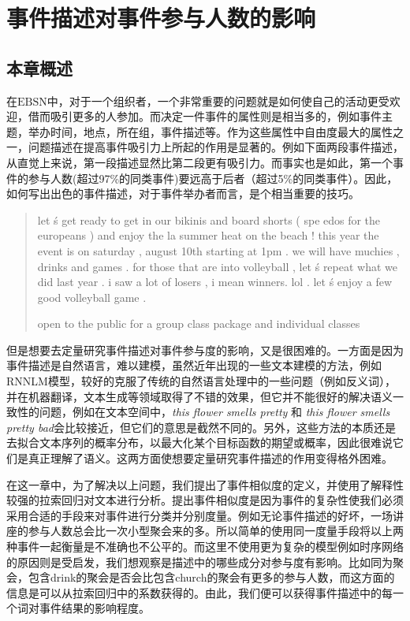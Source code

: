 \documentclass[12pt]{template}
\begin{document}
\section{事件描述对事件参与人数的影响} 
\subsection{本章概述} 
在$\mathrm{EBSN}$中，对于一个组织者，一个非常重要的问题就是如何使自己的活动更受欢迎，借而吸引更多的人参加。而决定一件事件的属性则是相当多的，例如事件主题，举办时间，地点，所在组，事件描述等。作为这些属性中自由度最大的属性之一，问题描述在提高事件吸引力上所起的作用是显著的。例如下面两段事件描述，从直觉上来说，第一段描述显然比第二段更有吸引力。而事实也是如此，第一个事件的参与人数(超过97\%的同类事件)要远高于后者（超过5\%的同类事件）。因此，如何写出出色的事件描述，对于事件举办者而言，是个相当重要的技巧。
 
\begin{quotation}
  let  \' s get ready to get in our bikinis and board shorts  (  spe
  edos for the europeans  )  and enjoy the la summer heat on the beach
  !  this year the event is on saturday  ,  august 10th starting at 
  1pm . we will have muchies  ,  drinks and games . for those that 
  are into volleyball  ,  let  \' s repeat what we did last year . 
  i saw a lot of losers  ,  i mean winners. lol . let  \' s enjoy 
  a few good volleyball game .
    
  open to the public for a group class package and individual classes
\end{quotation}

但是想要去定量研究事件描述对事件参与度的影响，又是很困难的。一方面是因为事件描述是自然语言，难以建模，虽然近年出现的一些文本建模的方法，例如RNNLM模型，较好的克服了传统的自然语言处理中的一些问题（例如反义词），并在机器翻译，文本生成等领域取得了不错的效果，但它并不能很好的解决语义一致性的问题，例如在文本空间中，\textit{this flower smells pretty} 和 \textit{this flower smells pretty bad}会比较接近，但它们的意思是截然不同的。另外，这些方法的本质还是去拟合文本序列的概率分布，以最大化某个目标函数的期望或概率，因此很难说它们是真正理解了语义。这两方面使想要定量研究事件描述的作用变得格外困难。

在这一章中，为了解决以上问题，我们提出了事件相似度的定义，并使用了解释性较强的拉索回归对文本进行分析。提出事件相似度是因为事件的复杂性使我们必须采用合适的手段来对事件进行分类并分别度量。例如无论事件描述的好坏，一场讲座的参与人数总会比一次小型聚会来的多。所以简单的使用同一度量手段将以上两种事件一起衡量是不准确也不公平的。而这里不使用更为复杂的模型例如时序网络的原因则是受\citep{noauthor_predicting_nodate}启发，我们想观察是描述中的哪些成分对参与度有影响。比如同为聚会，包含drink的聚会是否会比包含church的聚会有更多的参与人数，而这方面的信息是可以从拉索回归中的系数获得的。由此，我们便可以获得事件描述中的每一个词对事件结果的影响程度。
\end{document}
